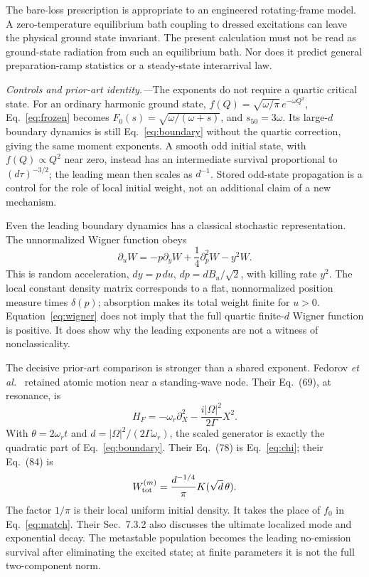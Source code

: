 \documentclass[aps,prl,reprint,superscriptaddress,nofootinbib]{revtex4-2}
\begin{document}
The bare-loss prescription is appropriate to an engineered rotating-frame model. A zero-temperature equilibrium bath coupling to dressed excitations can leave the physical ground state invariant. The present calculation must not be read as ground-state radiation from such an equilibrium bath. Nor does it predict general preparation-ramp statistics or a steady-state interarrival law.

\emph{Controls and prior-art identity.---}The exponents do not require a quartic critical state. For an ordinary harmonic ground state,
$f(Q)=\sqrt{\omega/\pi}\,e^{-\omega Q^2}$, Eq.~\eqref{eq:frozen} becomes
$F_0(s)=\sqrt{\omega/(\omega+s)}$, and $s_{50}=3\omega$. Its large-$d$ boundary dynamics is still Eq.~\eqref{eq:boundary} without the quartic correction, giving the same moment exponents. A smooth odd initial state, with $f(Q)\propto Q^2$ near zero, instead has an intermediate survival proportional to $(d\tau)^{-3/2}$; the leading mean then scales as $d^{-1}$. Stored odd-state propagation is a control for the role of local initial weight, not an additional claim of a new mechanism.

Even the leading boundary dynamics has a classical stochastic representation. The unnormalized Wigner function obeys
\begin{equation}
 \partial_u W=-p\partial_y W+\frac14\partial_p^2W-y^2W.
 \label{eq:wigner}
\end{equation}
This is random acceleration, $dy=p\,du$, $dp=dB_u/\sqrt2$, with killing rate $y^2$. The local constant density matrix corresponds to a flat, nonnormalized position measure times $\delta(p)$; absorption makes its total weight finite for $u>0$. Equation~\eqref{eq:wigner} does not imply that the full quartic finite-$d$ Wigner function is positive. It does show why the leading exponents are not a witness of nonclassicality.

The decisive prior-art comparison is stronger than a shared exponent. Fedorov \emph{et al.}~\cite{Fedorov} retained atomic motion near a standing-wave node. Their Eq.~(69), at resonance, is
\begin{equation}
 H_F=-\omega_r\partial_X^2-
 \frac{i|\Omega|^2}{2\Gamma}X^2.
\end{equation}
With $\theta=2\omega_rt$ and $d=|\Omega|^2/(2\Gamma\omega_r)$, the scaled generator is exactly the quadratic part of Eq.~\eqref{eq:boundary}. Their Eq.~(78) is Eq.~\eqref{eq:chi}; their Eq.~(84) is
\begin{equation}
 W_{\rm tot}^{(m)}=\frac{d^{-1/4}}{\pi}K(\sqrt d\,\theta).
\end{equation}
The factor $1/\pi$ is their local uniform initial density. It takes the place of $f_0$ in Eq.~\eqref{eq:match}. Their Sec.~7.3.2 also discusses the ultimate localized mode and exponential decay. The metastable population becomes the leading no-emission survival after eliminating the excited state; at finite parameters it is not the full two-component norm.
\end{document}
